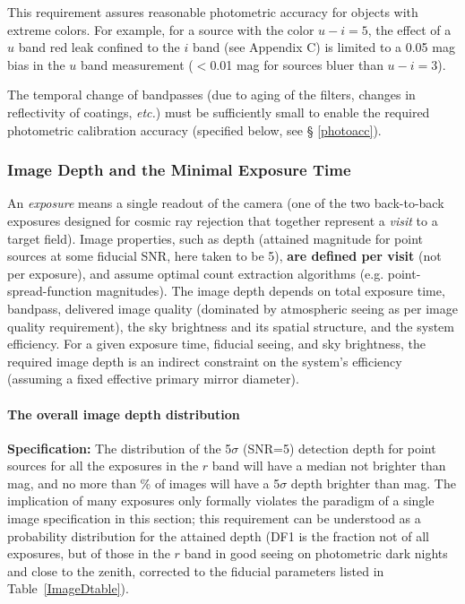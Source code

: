 This requirement assures reasonable photometric accuracy for objects with
extreme colors. For example, for a source with the color $u-i=5$, the
effect of a $u$ band red leak confined to the $i$ band (\eg see Appendix
C) is limited to a 0.05 mag bias in the $u$ band measurement ($<$0.01 mag
for sources bluer than $u-i=3$).

The temporal change of bandpasses (due to aging of the filters, changes in
reflectivity of coatings, {\it etc.}) must be sufficiently small to enable
the required photometric calibration accuracy (specified below, see \S
\ref{photoacc}).



\subsubsection{Image Depth and the Minimal Exposure Time}

An {\it exposure} means a single readout of the camera (one of the two
back-to-back exposures designed for cosmic ray rejection that together
represent a {\it visit} to a target field).  Image properties, such as
depth (attained magnitude for point sources at some fiducial SNR, here
taken to be 5), {\bf are defined per visit} (not per exposure), and assume optimal
count extraction algorithms (e.g. point-spread-function magnitudes). The image
depth depends on total exposure time, bandpass, delivered image quality
(dominated by atmospheric seeing as per image quality requirement), the sky
brightness and its spatial structure, and the system efficiency. For a
given exposure time, fiducial seeing, and sky brightness, the required
image depth is an indirect constraint on the system's efficiency (assuming
a fixed effective primary mirror diameter).


\paragraph{The overall image depth distribution\\}
\label{singleimagedepth}


{\bf Specification:} The distribution of the 5$\sigma$ (SNR=5) detection
depth for point sources for all the exposures in the $r$ band will have a
median not brighter than
mag, and no more than
\% of
images will have a 5$\sigma$ depth brighter than
mag. The implication
of many exposures only formally violates the paradigm of a single image
specification in this section; this requirement can be understood as a
probability distribution for the attained depth (DF1 is the fraction
not of all exposures, but of those in the $r$ band in good seeing on photometric
dark nights and close to the zenith, corrected to the fiducial parameters
listed in Table~\ref{ImageDtable}).

